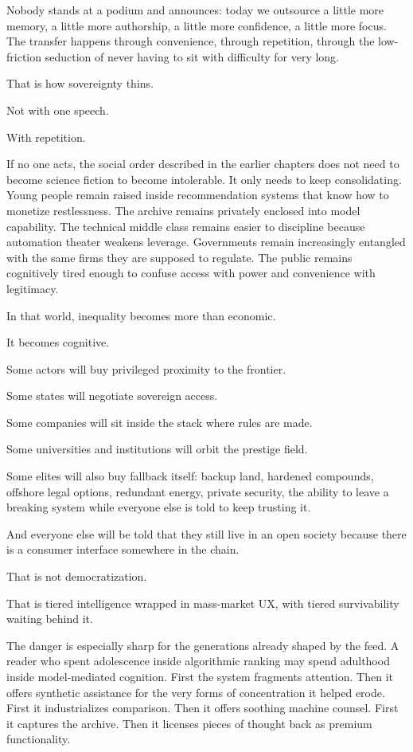 \documentclass[
  american,
  12pt,
  letterpaper,
]{article}
\begin{document}
Nobody stands at a podium and announces: today we outsource a little
more memory, a little more authorship, a little more confidence, a
little more focus. The transfer happens through convenience, through
repetition, through the low-friction seduction of never having to sit
with difficulty for very long.

That is how sovereignty thins.

Not with one speech.

With repetition.

If no one acts, the social order described in the earlier chapters does
not need to become science fiction to become intolerable. It only needs
to keep consolidating. Young people remain raised inside recommendation
systems that know how to monetize restlessness. The archive remains
privately enclosed into model capability. The technical middle class
remains easier to discipline because automation theater weakens
leverage. Governments remain increasingly entangled with the same firms
they are supposed to regulate. The public remains cognitively tired
enough to confuse access with power and convenience with legitimacy.

In that world, inequality becomes more than economic.

It becomes cognitive.

Some actors will buy privileged proximity to the frontier.

Some states will negotiate sovereign access.

Some companies will sit inside the stack where rules are made.

Some universities and institutions will orbit the prestige field.

Some elites will also buy fallback itself: backup land, hardened
compounds, offshore legal options, redundant energy, private security,
the ability to leave a breaking system while everyone else is told to
keep trusting it.

And everyone else will be told that they still live in an open society
because there is a consumer interface somewhere in the chain.

That is not democratization.

That is tiered intelligence wrapped in mass-market UX, with tiered
survivability waiting behind it.

The danger is especially sharp for the generations already shaped by the
feed. A reader who spent adolescence inside algorithmic ranking may
spend adulthood inside model-mediated cognition. First the system
fragments attention. Then it offers synthetic assistance for the very
forms of concentration it helped erode. First it industrializes
comparison. Then it offers soothing machine counsel. First it captures
the archive. Then it licenses pieces of thought back as premium
functionality.
\end{document}
